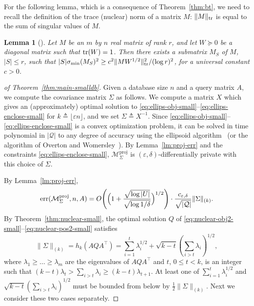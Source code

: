 \documentclass{article}
\newtheorem{lemma}{Lemma}[theorem]
\def\tr{{\rm tr}} \def\rank{{\rm rank}}
\newcommand{\alg}{\mathcal{M}}
\newcommand{\mech}{\mathcal{M}}
\newcommand{\eps}{\varepsilon}
\DeclareMathOperator{\err}{err}
\newcommand{\tra}{\intercal}
\newcommand{\quer}{\mathcal{Q}}
\begin{document}
For the following lemma, which is a consequence of
Theorem~\ref{thm:bt}, we need to recall the definition of the trace
(nuclear) norm of a matrix $M$: $\|M\|_{{\tr}}$ is equal to the
sum of singular values of $M$.

\begin{lemma}[\cite{apx-disc}]\label{lm:bt-lb}
  Let $M$ be an $m$ by $n$ real matrix of rank $r$, and let $W \succeq
  0$ be a diagonal matrix such that $\tr(W) = 1$. Then there exists a
  submatrix $M_S$ of $M$, $|S| \leq r$, such that
  $|S|\sigma_{\min}(M_S)^2 \geq {c^2\|MW^{1/2}\|_{\tr}^2}/{(\log
    r)^2}$, for a universal constant $c > 0$.
\end{lemma}


\begin{proof}[of Theorem~\ref{thm:main-smalldb}]
  Given a database size $n$ and a query matrix $A$, we compute the
  covariance matrix $\Sigma$ as follows. We compute a matrix $X$ which
  gives an (approximately) optimal solution to
  \eqref{eq:ellips-obj-small}--\eqref{eq:ellips-enclose-small} for  $k \triangleq
  \lfloor \eps n \rfloor$, and we
  set $\Sigma\triangleq X^{-1}$. Since
  \eqref{eq:ellips-obj-small}--\eqref{eq:ellips-enclose-small} is a
  convex optimization problem, it can be solved in time polynomial in
  $|\quer|$ to any degree of accuracy using the ellipsoid
  algorithm~\cite{GLS-ellipsoid} (or the algorithm of Overton and
  Womersley~\cite{OvertonW93-kyfan}). By Lemma~\ref{lm:proj-err} and
  the constraints \eqref{eq:ellips-enclose-small},
  $\mech_\Sigma^{\text{proj}}$ is $(\eps, \delta)$-differentially
  private with this choice of $\Sigma$.

  By Lemma~\ref{lm:proj-err},
  \begin{equation}\label{eq:proj-err}
    \err(\alg_\Sigma^{\text{proj}}, n, A) =O\Biggl(\Bigl(1+\frac{\sqrt{\log |U|}}{\sqrt{\log
      1/\delta}}\Bigr)^{1/2}\Biggr) \cdot \frac{c_{\eps,\delta}}{\sqrt{|\quer|}} \|\Sigma\|_{(k)}.
  \end{equation}
  By Theorem~\ref{thm:nuclear-small}, the optimal solution $Q$ of
  \eqref{eq:nuclear-obj2-small}--\eqref{eq:nuclear-pos2-small}
  satisfies
  \[
  \|\Sigma\|_{(k)} = h_k(AQA^\tra) = \sum_{i = 1}^t{\lambda_i^{1/2}} +
  \sqrt{k-t}\left(\sum_{i > t}{\lambda_i}\right)^{1/2},
  \]
  where $\lambda_1 \geq \ldots \geq \lambda_m$ are the eigenvalues
  of $AQA^\tra$ and $t$, $0\leq t < k$, is an integer such that $(k-t)\lambda_t > \sum_{i >
    t}\lambda_i \geq (k-t)\lambda_{t+1}$. At least one of $\sum_{i =
    1}^t{\lambda_i^{1/2}}$ and $\sqrt{k-t}\left(\sum_{i >
      t}{\lambda_i}\right)^{1/2}$ must be bounded from below by
  $\frac{1}{2}\|\Sigma\|_{(k)}$. Next we consider these two cases separately.


\end{proof}
\end{document}
